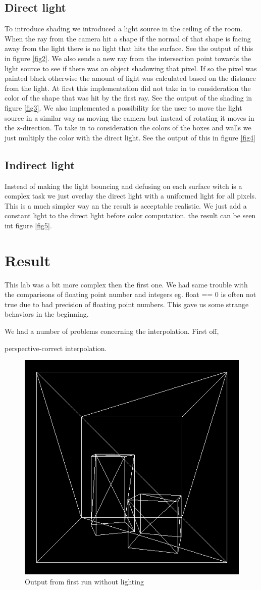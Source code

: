 \documentclass[a4paper,11pt]{article}
\begin{document}
\subsection{Direct light}
To introduce shading we introduced a light source in the ceiling of the room. When the ray from the camera hit a shape if the normal of that shape is facing away from the light there is no light that hits the surface. See the output of this in figure \ref{fig2}. We also sends a new ray from the intersection point towards the light source to see if there was an object shadowing that pixel. If so the pixel was painted black otherwise the amount of light was calculated based on the distance from the light. At first this implementation did not take in to consideration the color of the shape that was hit by the first ray. See the output of the shading in figure \ref{fig3}.
We also implemented a possibility for the user to move the light source in a similar way as moving the camera but instead of rotating it moves in the \verb|x|-direction.
To take in to consideration the colors of the boxes and walls we just multiply the color with the direct light. See the output of this in figure \ref{fig4}

\subsection{Indirect light}
Instead of making the light bouncing and defusing on each surface witch is a complex task we just overlay the direct light with a uniformed light for all pixels. This is a much simpler way an the result is acceptable realistic. We just add a constant light to the direct light before color computation. the result can be seen int figure \ref{fig5}. 

\section{Result}
This lab was a bit more complex then the first one. We had same trouble with the comparisons of floating point number and integers eg. float == 0 is often not true due to bad precision of floating point numbers. This gave us some strange behaviors in the beginning.

We had a number of problems concerning the interpolation. First off, 

perspective-correct interpolation. 

\begin{figure}[h!]
	\centering	
	\includegraphics[width=0.45\linewidth]{screenshot1.png}
	\caption{Output from first run without lighting}
	\label{fig1}
\end{figure}
\end{document}
